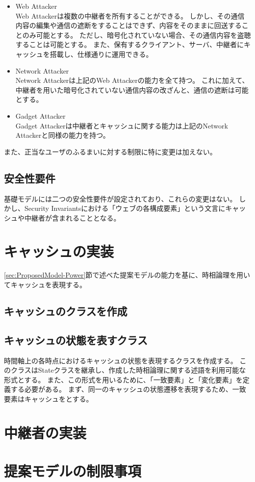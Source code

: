 \documentclass[12pt,a4paper]{jbook}
\begin{document}
\begin{itemize}
\item Web Attacker\\
Web Attackerは複数の中継者を所有することができる。
しかし、その通信内容の編集や通信の遮断をすることはできず、内容をそのままに回送することのみ可能とする。
ただし、暗号化されていない場合、その通信内容を盗聴することは可能とする。
また、保有するクライアント、サーバ、中継者にキャッシュを搭載し、仕様通りに運用できる。
\item Network Attacker\\
Network Attackerは上記のWeb Attackerの能力を全て持つ。
これに加えて、中継者を用いた暗号化されていない通信内容の改ざんと、通信の遮断は可能とする。
\item Gadget Attacker\\
Gadget Attackerは中継者とキャッシュに関する能力は上記のNetwork Attackerと同様の能力を持つ。
\end{itemize}

また、正当なユーザのふるまいに対する制限に特に変更は加えない。

\subsection{安全性要件}
基礎モデルには二つの安全性要件が設定されており、これらの変更はない。
しかし、Security Invariantsにおける「ウェブの各構成要素」という文言にキャッシュや中継者が含まれることとなる。

\section{キャッシュの実装}
\ref{sec:ProposedModel-Power}節で述べた提案モデルの能力を基に、時相論理を用いてキャッシュを表現する。

\subsection{キャッシュのクラスを作成}


\subsection{キャッシュの状態を表すクラス}
時間軸上の各時点におけるキャッシュの状態を表現するクラスを作成する。
このクラスはStateクラスを継承し、作成した時相論理に関する述語を利用可能な形式とする。
また、この形式を用いるために、「一致要素」と「変化要素」を定義する必要がある。
まず、同一のキャッシュの状態遷移を表現するため、一致要素はキャッシュをとする。

\section{中継者の実装}
\section{提案モデルの制限事項}
\color{black}
\end{document}
